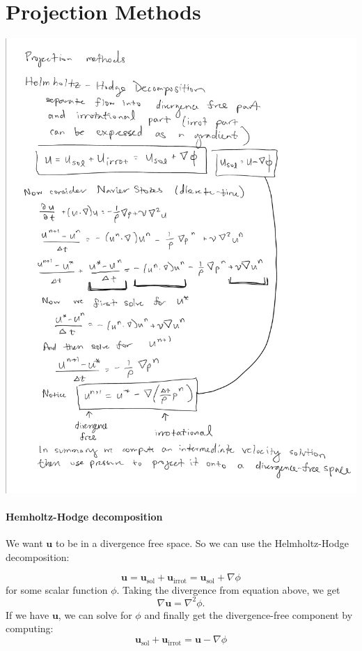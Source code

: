 \documentclass[12pt,a4paper,twoside]{article}
\begin{document}
\section{Projection Methods}\includegraphics[scale=.5]{projection-method.png}

\paragraph{Hemholtz-Hodge decomposition}
We want $\bm{u}$ to be in a divergence free space. So we can use the Helmholtz-Hodge decomposition: 

\begin{equation*}
    \bm{u} = \bm{u}_\text{sol} + \bm{u}_\text{irrot}  = \bm{u}_\text{sol} + \nabla \phi
\end{equation*}
for some scalar function $\phi$.  Taking the divergence from equation above, we get 
\begin{equation*}
\nabla \bm{u} = \nabla^2\phi.    
\end{equation*}
If we have $\bm{u}$, we can solve for $\phi$ and finally get the divergence-free component by computing:
\begin{equation}\label{eq:helmholtz_hodge}
\bm{u}_\text{sol} + \bm{u}_\text{irrot}  = \bm{u}  -  \nabla \phi
\end{equation}
\end{document}
